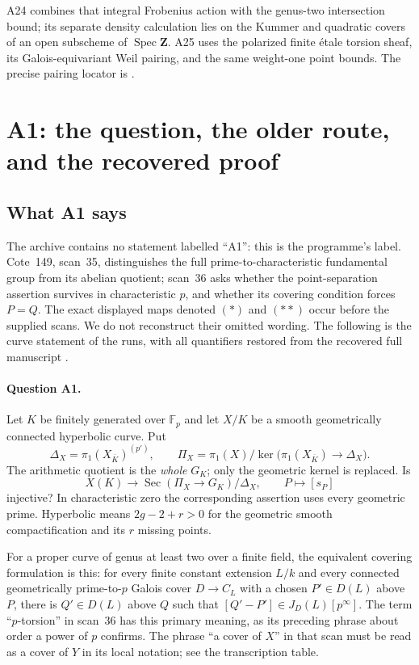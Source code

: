 \documentclass[11pt,a4paper]{article}
\begin{document}
A24 combines that integral Frobenius action with the genus-two
intersection bound; its separate density calculation lies on the
Kummer and quadratic covers of an open subscheme of
$\operatorname{Spec}\mathbf Z$. A25 uses the polarized finite
\'etale torsion sheaf, its Galois-equivariant Weil pairing, and
the same weight-one point bounds. The precise pairing locator is
\cite[\S16 and Lemma~16.2(e)]{MilneAV}.


\section{A1: the question, the older route, and the recovered proof}
\label{sec:a1}

\subsection{What A1 says}
The archive contains no statement labelled ``A1'': this is the programme's
label. Cote~149, scan~35, distinguishes the full prime-to-characteristic
fundamental group from its abelian quotient; scan~36 asks whether the
point-separation assertion survives in characteristic $p$, and whether its
covering condition forces $P=Q$. The exact displayed maps denoted $(*)$ and
$(**)$ occur before the supplied scans. We do not reconstruct their omitted
wording. The following is the curve statement of the runs, with all
quantifiers restored from the recovered full manuscript
\cite[A.1, A.31--A.33]{A1run}.

\paragraph{Question A1.}
Let $K$ be finitely generated over $\mathbb F_p$ and let $X/K$ be a smooth
geometrically connected hyperbolic curve. Put
\[
 \Delta_X=\pi_1(X_{\overline K})^{(p')},\qquad
 \Pi_X=\pi_1(X)/\ker\bigl(\pi_1(X_{\overline K})\to\Delta_X\bigr).
\]
The arithmetic quotient is the \emph{whole} $G_K$; only the geometric
kernel is replaced. Is
\[
 X(K)\longrightarrow
 \operatorname{Sec}(\Pi_X\to G_K)/\Delta_X,
 \qquad P\longmapsto[s_P]
 \tag{A1}
\]
injective? In characteristic zero the corresponding assertion uses every
geometric prime. Hyperbolic means $2g-2+r>0$ for the geometric smooth
compactification and its $r$ missing points.

For a proper curve of genus at least two over a finite field, the equivalent
covering formulation is this: for every finite constant extension $L/k$
and every connected geometrically prime-to-$p$ Galois cover $D\to C_L$
with a chosen $P'\in D(L)$ above $P$, there is $Q'\in D(L)$ above $Q$
such that $[Q'-P']\in J_D(L)[p^\infty]$. The term ``$p$-torsion'' in
scan~36 has this primary meaning, as its preceding phrase about order a
power of $p$ confirms. The phrase ``a cover of $X$'' in that scan must be
read as a cover of $Y$ in its local notation; see the transcription table.
\end{document}
